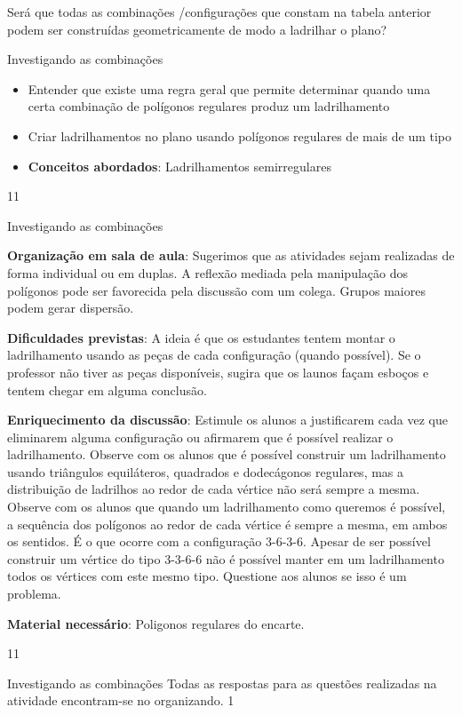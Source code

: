 Será que todas as  combinações /configurações que constam na tabela anterior podem ser construídas geometricamente de modo a ladrilhar o plano?

\clearpage
\def\currentcolor{session1}

\begin{objectives}{Investigando as combinações}
{
	\begin{itemize}
	\item Entender que existe uma regra geral que permite determinar quando uma certa combinação de polígonos regulares produz um ladrilhamento
	\item Criar ladrilhamentos no plano usando polígonos regulares de mais de um tipo
	\item \textbf{Conceitos abordados}: Ladrilhamentos semirregulares
	\end{itemize}
}{1}{1}
\end{objectives}
\begin{sugestions}{Investigando as combinações}
{
	\textbf{Organização em sala de aula}: Sugerimos que as atividades sejam realizadas de forma individual ou em duplas. A reflexão mediada pela manipulação dos polígonos pode ser favorecida pela discussão com um colega. Grupos maiores podem gerar dispersão.

	\textbf{Dificuldades previstas}: A ideia é que os estudantes  tentem  montar o ladrilhamento usando as peças de cada configuração (quando possível). Se o professor não tiver as peças disponíveis, sugira que os launos façam esboços e tentem chegar em alguma conclusão.
 
	\textbf{Enriquecimento da discussão}: Estimule os alunos a justificarem cada vez que eliminarem alguma configuração ou afirmarem que é possível realizar o ladrilhamento. Observe com os alunos que é possível construir um ladrilhamento usando triângulos equiláteros, quadrados e dodecágonos regulares, mas a distribuição de ladrilhos ao redor de cada vértice não será sempre a mesma. Observe com os alunos que quando um ladrilhamento como queremos é possível,  a sequência dos polígonos ao redor
	de cada vértice é sempre a mesma, em ambos os sentidos. É o  que ocorre com a configuração 3-6-3-6.  Apesar de ser possível construir um vértice do tipo 3-3-6-6 não é possível manter em um ladrilhamento todos os vértices com este mesmo tipo. Questione aos alunos se isso é um problema.

	\textbf{Material necessário}: Poligonos regulares do encarte.
}{1}{1}
\end{sugestions}
\begin{answer}{Investigando as combinações}
{
	Todas as respostas para as questões realizadas na atividade encontram-se no organizando.
}{1}
\end{answer}

